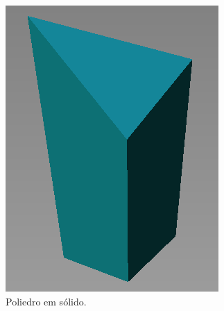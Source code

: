 \begin{figure}[H]
\begin{subfigure}[t]{0.3\textwidth}
        \includegraphics[width=\textwidth]{dados/figuras/pol_solid.png}
        \caption{Poliedro em sólido.}
        \label{fig:polyhedron2}
    \end{subfigure}
    \hspace{1em}
    \begin{subfigure}[t]{0.3\textwidth}

\end{subfigure}
\end{figure}
